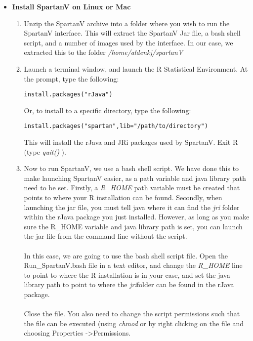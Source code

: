 \documentclass[a4paper,11pt]{article}
\begin{document}
\begin{itemize}
\item \textbf{Install SpartanV on Linux or Mac}\\

\begin{enumerate}

\item Unzip the SpartanV archive into a folder where you wish to run the SpartanV interface. This will extract the SpartanV Jar file, a bash shell script, and a number of images used by the interface. In our case, we extracted this to the folder \textit{/home/aldenkj/spartanV}
\\

\item Launch a terminal window, and launch the R Statistical Environment. At the prompt, type the following:
\begin{verbatim}
install.packages("rJava")
\end{verbatim}
Or, to install to a specific directory, type the following:
\begin{verbatim}
install.packages("spartan",lib="/path/to/directory")
\end{verbatim}
This will install the rJava and JRi packages used by SpartanV. Exit R (type \textit{quit()} ).

\item Now to run SpartanV, we use a bash shell script. We have done this to make launching SpartanV easier, as a path variable and java library path need to be set. Firstly, a \textit{R\_HOME} path variable must be created that points to where your R installation can be found. Secondly, when launching the jar file, you must tell java where it can find the \textit{jri} folder within the rJava package you just installed. However, as long as you make sure the R\_HOME variable and java library path is set, you can launch the jar file from the command line without the script.\\
\\
In this case, we are going to use the bash shell script file. Open the Run\_SpartanV.bash file in a text editor, and change the \textit{R\_HOME} line to point to where the R installation is in your case, and set the java library path to point to where the \textit{jri}folder can be found in the rJava package.\\
\\
Close the file. You also need to change the script permissions such that the file can be executed (using \textit{chmod} or by right clicking on the file and choosing Properties -\textgreater Permissions.
\\


\end{enumerate}
\end{itemize}
\end{document}
